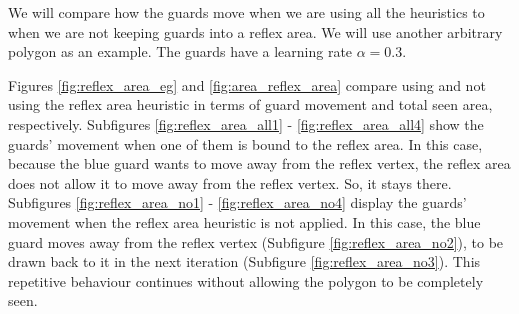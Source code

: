 We will compare how the guards move when we are using all the heuristics to when we are not keeping guards into a reflex area. We will use another arbitrary polygon as an example. The guards have a learning rate $\alpha = 0.3$.

Figures \ref{fig:reflex_area_eg} and \ref{fig:area_reflex_area} compare using and not using the reflex area heuristic in terms of guard movement and total seen area, respectively. Subfigures \ref{fig:reflex_area_all1} - \ref{fig:reflex_area_all4} show the guards' movement when one of them is bound to the reflex area. In this case, because the blue guard wants to move away from the reflex vertex, the reflex area does not allow it to move away from the reflex vertex. So, it stays there. 
Subfigures \ref{fig:reflex_area_no1} - \ref{fig:reflex_area_no4} display the guards' movement when the reflex area heuristic is not applied. In this case, the blue guard moves away from the reflex vertex (Subfigure \ref{fig:reflex_area_no2}), to be drawn back to it in the next iteration (Subfigure \ref{fig:reflex_area_no3}). This repetitive behaviour continues without allowing the polygon to be completely seen.

